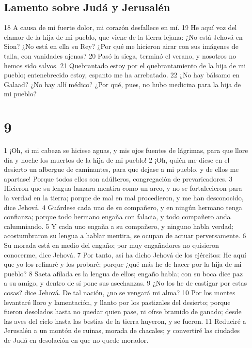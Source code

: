 \section*{Lamento sobre Judá y Jerusalén}

18 A causa de mi fuerte dolor, mi corazón desfallece en mí.
19 He aquí voz del clamor de la hija de mi pueblo, que viene de la tierra lejana: ¿No está Jehová en Sion? ¿No está en ella su Rey? ¿Por qué me hicieron airar con sus imágenes de talla, con vanidades ajenas?
20 Pasó la siega, terminó el verano, y nosotros no hemos sido salvos.
21 Quebrantado estoy por el quebrantamiento de la hija de mi pueblo; entenebrecido estoy, espanto me ha arrebatado.
22 ¿No hay bálsamo en Galaad? ¿No hay allí médico? ¿Por qué, pues, no hubo medicina para la hija de mi pueblo?

\chapter{9}

1 ¡Oh, si mi cabeza se hiciese aguas, y mis ojos fuentes de lágrimas, para que llore día y noche los muertos de la hija de mi pueblo!
2 ¡Oh, quién me diese en el desierto un albergue de caminantes, para que dejase a mi pueblo, y de ellos me apartase! Porque todos ellos son adúlteros, congregación de prevaricadores.
3 Hicieron que su lengua lanzara mentira como un arco, y no se fortalecieron para la verdad en la tierra; porque de mal en mal procedieron, y me han desconocido, dice Jehová.
4 Guárdese cada uno de su compañero, y en ningún hermano tenga confianza; porque todo hermano engaña con falacia, y todo compañero anda calumniando.
5 Y cada uno engaña a su compañero, y ninguno habla verdad; acostumbraron su lengua a hablar mentira, se ocupan de actuar perversamente.
6 Su morada está en medio del engaño; por muy engañadores no quisieron conocerme, dice Jehová.
7 Por tanto, así ha dicho Jehová de los ejércitos: He aquí que yo los refinaré y los probaré; porque ¿qué más he de hacer por la hija de mi pueblo?
8 Saeta afilada es la lengua de ellos; engaño habla; con su boca dice paz a su amigo, y dentro de sí pone sus asechanzas.
9 ¿No los he de castigar por estas cosas? dice Jehová. De tal nación, ¿no se vengará mi alma?
10 Por los montes levantaré lloro y lamentación, y llanto por los pastizales del desierto; porque fueron desolados hasta no quedar quien pase, ni oírse bramido de ganado; desde las aves del cielo hasta las bestias de la tierra huyeron, y se fueron.
11 Reduciré a Jerusalén a un montón de ruinas, morada de chacales; y convertiré las ciudades de Judá en desolación en que no quede morador.

